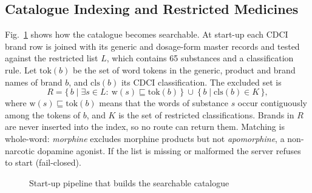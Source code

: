 \documentclass[11pt,a4paper]{article}
\begin{document}
\subsection{Catalogue Indexing and Restricted Medicines}
Fig.~\ref{fig:pipeline} shows how the catalogue becomes searchable. At start-up each CDCI brand row is joined with its generic and dosage-form master records and tested against the restricted list $L$, which contains 65 substances and a classification rule. Let $\mathrm{tok}(b)$ be the set of word tokens in the generic, product and brand names of brand $b$, and $\mathrm{cls}(b)$ its CDCI classification. The excluded set is
\begin{equation}
R=\{\,b \mid \exists s\in L:\ \mathrm{w}(s)\sqsubseteq \mathrm{tok}(b)\,\}\ \cup\ \{\,b \mid \mathrm{cls}(b)\in K\,\},
\label{eq:restricted}
\end{equation}
where $\mathrm{w}(s)\sqsubseteq \mathrm{tok}(b)$ means that the words of substance $s$ occur contiguously among the tokens of $b$, and $K$ is the set of restricted classifications. Brands in $R$ are never inserted into the index, so no route can return them. Matching is whole-word: \emph{morphine} excludes morphine products but not \emph{apomorphine}, a non-narcotic dopamine agonist. If the list is missing or malformed the server refuses to start (fail-closed).

\begin{figure}[H]
\centering
{}
\caption{Start-up pipeline that builds the searchable catalogue}
\label{fig:pipeline}
\end{figure}
\end{document}
